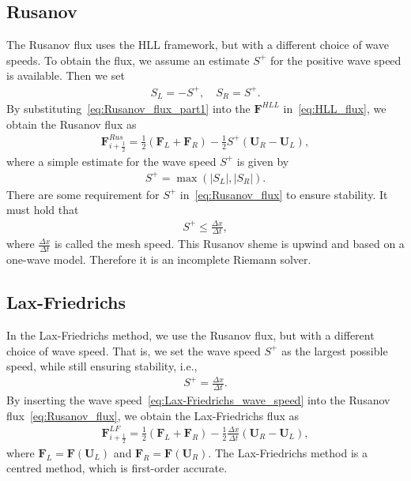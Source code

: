 \subsection*{Rusanov}
The Rusanov flux uses the HLL framework, but with a different choice of wave speeds.
To obtain the flux, we assume an estimate $S^+$ for the positive wave speed is available.
Then we set 
\begin{align}\label{eq:Rusanov_flux_part1}
    S_L = -S^+, \quad S_R = S^+.
\end{align}
By substituting~\eqref{eq:Rusanov_flux_part1} into the $\mathbf{F}^{HLL}$ in~\eqref{eq:HLL_flux}, we obtain the Rusanov flux as
\begin{align}\label{eq:Rusanov_flux}
    \mathbf{F}_{i+\frac{1}{2}}^{Rus} = \frac{1}{2} \left( \mathbf{F}_{L} + \mathbf{F}_{R}  \right)
    - \frac{1}{2} S^+ \left( \mathbf{U}_R - \mathbf{U}_L \right),
\end{align}
where a simple estimate for the wave speed $S^+$ is given by
\begin{align*}
    S^+ = \max ( |S_L|, |S_R|).
\end{align*}
There are some requirement for $S^+$ in~\eqref{eq:Rusanov_flux} to ensure stability.
It must hold that 
\begin{align*}
    S^+ \leq \frac{\Delta x}{\Delta t},
\end{align*}
where $\frac{\Delta x}{\Delta t}$ is called the mesh speed.
This Rusanov sheme is upwind and based on a one-wave model.
Therefore it is an incomplete Riemann solver.

\subsection*{Lax-Friedrichs}
In the Lax-Friedrichs method, we use the Rusanov flux, but with a different choice of wave speed.
That is, we set the wave speed $S^+$ as the largest possible speed, while still ensuring stability, i.e.,
\begin{align}\label{eq:Lax-Friedrichs_wave_speed}
    S^+ = \frac{\Delta x}{\Delta t}.
\end{align}
By inserting the wave speed~\eqref{eq:Lax-Friedrichs_wave_speed} into the Rusanov flux~\eqref{eq:Rusanov_flux}, we obtain the Lax-Friedrichs flux as
\begin{align*}
    \mathbf{F}_{i+\frac{1}{2}}^{LF} = \frac{1}{2} \left( {\mathbf{F}}_{L} + {\mathbf{F}}_{R} \right) - \frac{1}{2} \frac{\Delta x}{\Delta t} \left( \mathbf{U}_R - \mathbf{U}_L \right),
\end{align*}
where $\mathbf{F}_L = \mathbf{F}(\mathbf{U}_L)$ and $\mathbf{F}_R = \mathbf{F}(\mathbf{U}_R)$.
The Lax-Friedrichs method is a centred method, which is first-order accurate.

